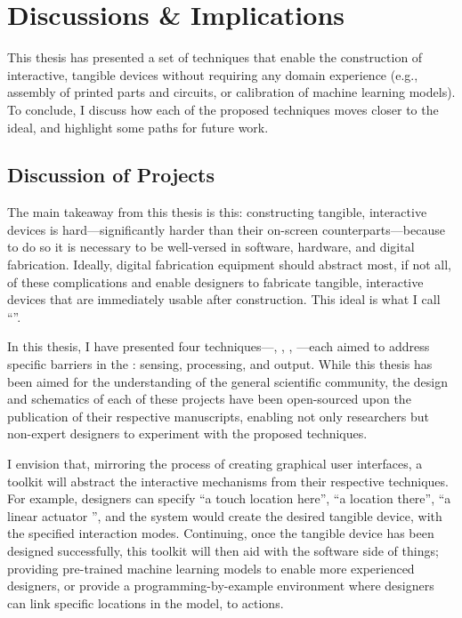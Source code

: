 \chapter{Discussions \& Implications} \label{ch:discussion}
  This thesis has presented a set of techniques that enable the construction of
  interactive, tangible devices without requiring any domain experience (e.g.,
  assembly of printed parts and circuits, or calibration of machine learning
  models). To conclude, I discuss how each of the proposed techniques moves
  closer to the \papf ideal, and highlight some paths for future work.

  \section{Discussion of Projects}
    The main takeaway from this thesis is this: constructing tangible,
    interactive devices is hard---significantly harder than their on-screen
    counterparts---because to do so it is necessary to be well-versed in
    software, hardware, and digital fabrication. Ideally, digital fabrication
    equipment should abstract most, if not all, of these complications and
    enable designers to fabricate tangible, interactive devices that are
    immediately usable after construction. This ideal  is what I
    call ``\papf''.

    In this thesis, I have presented four \pap techniques---\al, \bh, \al,
    \mp---each aimed to address specific barriers in the : sensing, processing, and output. While this thesis has been aimed
    for the understanding of the general scientific community, the design and
    schematics of each of these projects have been open-sourced upon the
    publication of their respective manuscripts, enabling not only researchers
    but non-expert designers to experiment with the proposed techniques.

    I envision that, mirroring the process of creating graphical user
    interfaces, a \papf toolkit will abstract the interactive mechanisms from
    their respective techniques. For example, designers can specify ``a touch
    location here'', ``a \bh location there'', ``a linear actuator '',
    and the system would create the desired tangible device, with the specified
    interaction modes. Continuing, once the tangible device has been designed
    successfully, this toolkit will then aid with the software side of things;
    providing pre-trained machine learning models to enable more experienced
    designers, or provide a programming-by-example environment where designers
    can link specific locations in the model, to actions.

